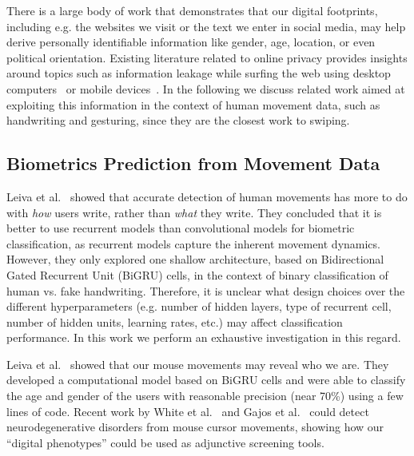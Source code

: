 \documentclass[sn-mathphys, pdflatex]{sn-jnl}
\begin{document}
There is a large body of work that demonstrates that our digital footprints,
including e.g. the websites we visit or the text we enter in social media,
may help derive personally identifiable information like gender, age, location, or even political orientation.
Existing literature related to online privacy provides insights around topics such as
information leakage while surfing the web using desktop computers~\cite{Starov_2016}
or mobile devices~\cite{Leung_2016}.
In the following we discuss related work aimed at exploiting this information
in the context of human movement data, such as handwriting and gesturing,
since they are the closest work to swiping.


\subsection{Biometrics Prediction from Movement Data}

Leiva et al.~\cite{Leiva20_biometrics} showed that accurate detection of human movements
has more to do with \emph{how} users write, rather than \emph{what} they write.
They concluded that it is better to use recurrent models than convolutional models for biometric classification,
as recurrent models capture the inherent movement dynamics.
However, they only explored one shallow architecture,
based on Bidirectional Gated Recurrent Unit (BiGRU) cells,
in the context of binary classification of human vs. fake handwriting.
Therefore, it is unclear what design choices over the different hyperparameters
(e.g. number of hidden layers, type of recurrent cell, number of hidden units, learning rates, etc.)
may affect classification performance.
In this work we perform an exhaustive investigation in this regard.


Leiva et al.~\cite{Leiva21_privacy} showed that our mouse movements may reveal who we are.
They developed a computational model based on BiGRU cells and were able to classify the age and gender of the users
with reasonable precision (near 70\%) using a few lines of code.
Recent work by White et al.~\cite{White18} and Gajos et al.~\cite{Gajos20}
could detect neurodegenerative disorders from mouse cursor movements,
showing how our ``digital phenotypes'' could be used as adjunctive screening tools.
\end{document}
